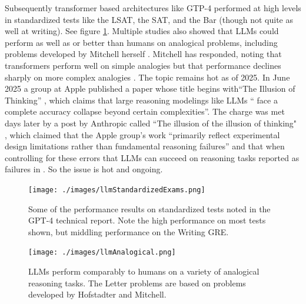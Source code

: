 Subsequently transformer based architectures like GTP-4 performed at high
levels in standardized tests like the LSAT, the SAT, and the Bar (though not
quite as well at writing). See figure \ref{llmStandardExams}. Multiple studies
also showed that LLMs could perform as well as or better than humans on
analogical problems, including problems developed by Mitchell herself
\cite{webb2023emergent}.  Mitchell has responded, noting  that transformers
perform well on simple analogies but that performance declines sharply on  more
complex analogies \cite{lewis2025evaluating}. The topic remains hot as of 2025.
In June 2025 a group at Apple published a paper whose title begins with``The
Illusion of Thinking'' \cite{shojaee2025illusion}, which claims that large
reasoning modelings like LLMs `` face a complete accuracy collapse beyond
certain complexities''. The charge was met days later by a post by Anthropic
called ``The illusion of the illusion of thinking" \cite{opus2025illusion},
which claimed that the Apple group's work ``primarily reflect experimental
design limitations rather than fundamental reasoning failures'' and that when
controlling for these errors that LLMs can succeed on reasoning tasks reported
as failures in \cite{shojaee2025illusion}. So the issue is hot and ongoing.

\begin{figure}[ht]
\centering
\texttt{[image: ./images/llmStandardizedExams.png]}
\caption[From \cite{achiam2023gpt}.]{Some of the performance results on
standardized tests noted in the GPT-4 technical report.  Note the high
performance on most tests shown, but middling performance on the Writing GRE.
}
\label{llmStandardExams}
\end{figure}

\begin{figure}[ht]
\centering
\texttt{[image: ./images/llmAnalogical.png]}
\caption[From \cite{webb2023emergent}.]{LLMs perform comparably to humans on a
variety of analogical reasoning tasks. The Letter problems are based on
problems developed by Hofstadter and Mitchell.
}
\label{llmAnalogy}
\end{figure}


